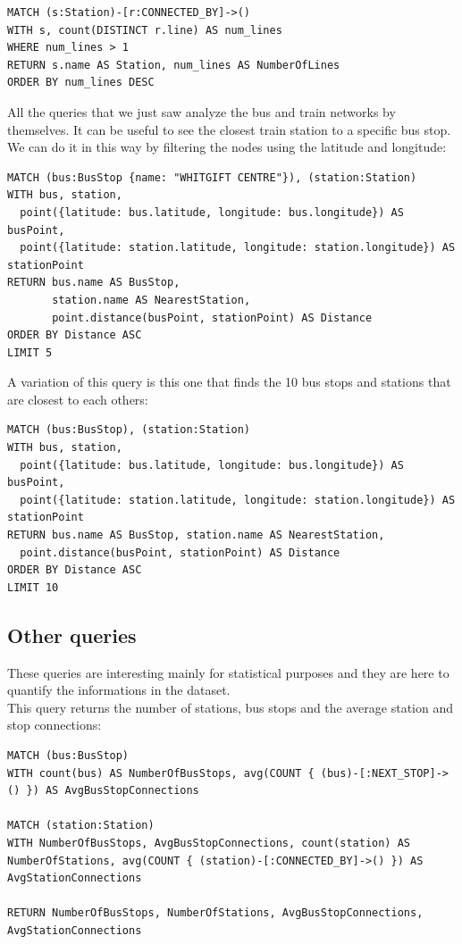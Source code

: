 \documentclass{Configuration_Files/PoliMi3i_thesis}
\begin{document}
\begin{lstlisting}[language=Cypher]
MATCH (s:Station)-[r:CONNECTED_BY]->()
WITH s, count(DISTINCT r.line) AS num_lines
WHERE num_lines > 1
RETURN s.name AS Station, num_lines AS NumberOfLines
ORDER BY num_lines DESC
\end{lstlisting}

All the queries that we just saw analyze the bus and train networks by themselves. It can be useful to see the closest train station to a specific bus stop. We can do it in this way by filtering the nodes using the latitude and longitude:

\begin{lstlisting}[language=Cypher]
MATCH (bus:BusStop {name: "WHITGIFT CENTRE"}), (station:Station)
WITH bus, station,
  point({latitude: bus.latitude, longitude: bus.longitude}) AS busPoint,
  point({latitude: station.latitude, longitude: station.longitude}) AS stationPoint
RETURN bus.name AS BusStop, 
       station.name AS NearestStation,
       point.distance(busPoint, stationPoint) AS Distance
ORDER BY Distance ASC
LIMIT 5
\end{lstlisting}

A variation of this query is this one that finds the 10 bus stops and stations that are closest to each others:

\begin{lstlisting}[language=Cypher]
MATCH (bus:BusStop), (station:Station)
WITH bus, station,
  point({latitude: bus.latitude, longitude: bus.longitude}) AS busPoint,
  point({latitude: station.latitude, longitude: station.longitude}) AS stationPoint
RETURN bus.name AS BusStop, station.name AS NearestStation,
  point.distance(busPoint, stationPoint) AS Distance
ORDER BY Distance ASC
LIMIT 10 
\end{lstlisting}

\subsection{Other queries}

These queries are interesting mainly for statistical purposes and they are here to quantify the informations in the dataset.\\

This query returns the number of stations, bus stops and the average station and stop connections:
\begin{lstlisting}[language=Cypher]
MATCH (bus:BusStop)
WITH count(bus) AS NumberOfBusStops, avg(COUNT { (bus)-[:NEXT_STOP]->() }) AS AvgBusStopConnections

MATCH (station:Station)
WITH NumberOfBusStops, AvgBusStopConnections, count(station) AS NumberOfStations, avg(COUNT { (station)-[:CONNECTED_BY]->() }) AS AvgStationConnections

RETURN NumberOfBusStops, NumberOfStations, AvgBusStopConnections, AvgStationConnections

\end{lstlisting}
\end{document}
